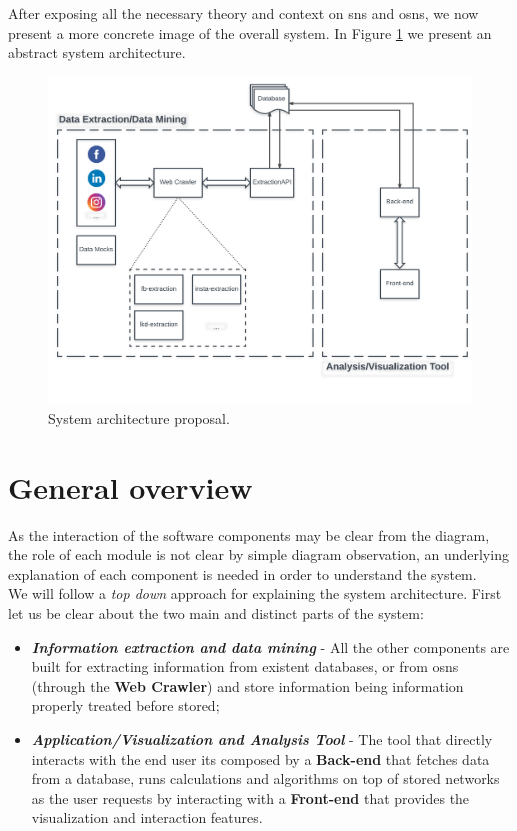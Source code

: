 After exposing all the necessary theory and context on \glspl{sn} and \glspl{osn}, we now present a more concrete image of the overall system. In Figure \ref{img:architectureprop} we present an abstract system architecture.

\begin{figure}[h!]
\begin{center}
  \hspace*{-0.3in}
  \includegraphics[width=1.1\textwidth]{img/architecture.png}
\end{center}
\caption{\label{img:architectureprop} System architecture proposal.}
\end{figure}

\section{General overview}
As the interaction of the software components may be clear from the diagram, the role of each module is not clear by simple
diagram observation, an underlying explanation of each component is needed in order to understand the system.\\
\indent We will follow a \textit{top down} approach for explaining the system architecture. First let us be clear about the two
main and distinct parts of the system:
\begin{itemize}
    \item \textbf{\textit{Information extraction and data mining}} - All the other components are built for extracting information
    from existent databases, or from \glspl{osn} (through the \textbf{Web Crawler}) and store information being information properly treated before stored;
    \item \textbf{\textit{Application/Visualization and Analysis Tool}} - The tool that directly interacts with the end user
    its composed by a \textbf{Back-end} that fetches data from a database, runs calculations and algorithms on top of stored networks
    as the user requests by interacting with a \textbf{Front-end} that provides the visualization and interaction features.
\end{itemize}


